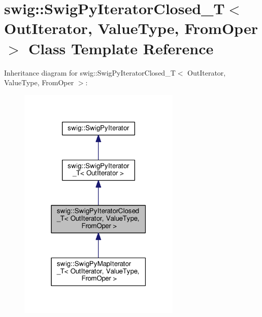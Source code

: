 \hypertarget{classswig_1_1SwigPyIteratorClosed__T}{}\section{swig\+:\+:Swig\+Py\+Iterator\+Closed\+\_\+T$<$ Out\+Iterator, Value\+Type, From\+Oper $>$ Class Template Reference}
\label{classswig_1_1SwigPyIteratorClosed__T}


Inheritance diagram for swig\+:\+:Swig\+Py\+Iterator\+Closed\+\_\+T$<$ Out\+Iterator, Value\+Type, From\+Oper $>$\+:\nopagebreak
\begin{figure}[H]
\begin{center}
\leavevmode
\includegraphics[width=219pt]{classswig_1_1SwigPyIteratorClosed__T__inherit__graph}
\end{center}
\end{figure}


